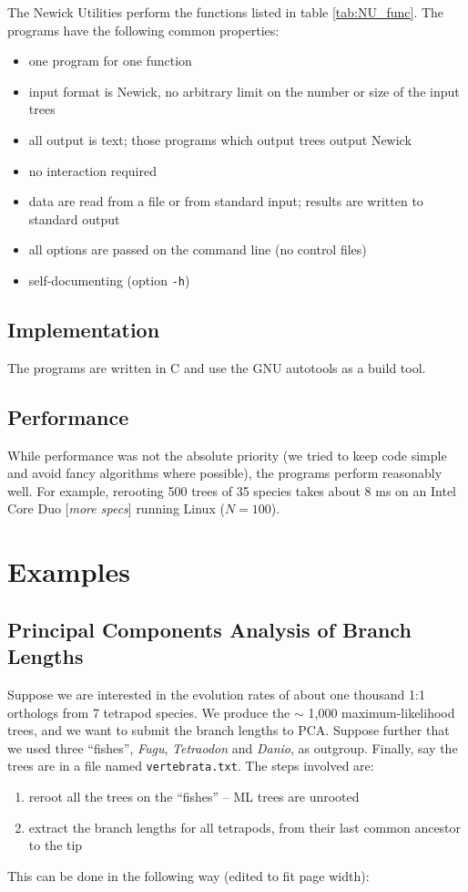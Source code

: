 \documentclass[a4paper,11pt]{article}
\newcommand{\nutils}{Newick Utilities}
\begin{document}
The \nutils{} perform the functions listed in table \ref{tab:NU_func}. The programs have the following common properties:

\begin{itemize}
 \item one program for one function
 \item input format is Newick, no arbitrary limit on the number or size of the input trees
 \item all output is text; those programs which output trees output Newick
 \item no interaction required
 \item data are read from a file or from standard input; results are written to standard output
 \item all options are passed on the command line (no control files)
 \item self-documenting (option \texttt{-h})
\end{itemize}

\subsection*{Implementation}

The programs are written in C and use the \textsc{GNU} autotools as a build tool.

\subsection*{Performance}

While performance was not the absolute priority (we tried to keep code simple and avoid fancy algorithms where possible), the programs perform reasonably well. For example, rerooting 500 trees of 35 species takes about 8 ms on an Intel Core Duo [\textit{more specs}] running Linux ($N = 100$).

\section*{Examples}

\subsection*{Principal Components Analysis of Branch Lengths}

Suppose we are interested in the evolution rates of about one thousand 1:1 orthologs from 7 tetrapod species. We produce the $\sim$ 1,000 maximum-likelihood trees, and we want to submit the branch lengths to \textsc{PCA}. Suppose further that we used three ``fishes'', \textit{Fugu}, \textit{Tetraodon} and \textit{Danio}, as outgroup. Finally, say the trees are in a file named \texttt{vertebrata.txt}. The steps involved are:
\begin{enumerate}
 \item reroot all the trees on the ``fishes'' -- ML trees are unrooted
 \item extract the branch lengths for all tetrapods, from their last common ancestor to the tip
\end{enumerate}
This can be done in the following way (edited to fit page width):
\end{document}
